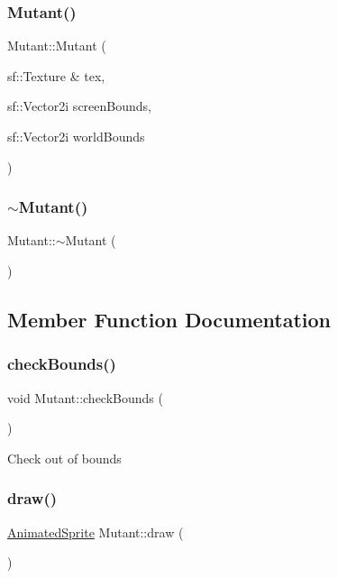 \subsubsection{\texorpdfstring{Mutant()}{Mutant()}}
{\footnotesize\ttfamily Mutant\+::\+Mutant (\begin{DoxyParamCaption}\item[{sf\+::\+Texture \&}]{tex,  }\item[{sf\+::\+Vector2i}]{screen\+Bounds,  }\item[{sf\+::\+Vector2i}]{world\+Bounds }\end{DoxyParamCaption})}

\mbox{\label{class_mutant_a03dc2cf4d08ea08bea6cd4ded784dfc1}} 
\subsubsection{\texorpdfstring{$\sim$\+Mutant()}{~Mutant()}}
{\footnotesize\ttfamily Mutant\+::$\sim$\+Mutant (\begin{DoxyParamCaption}{ }\end{DoxyParamCaption})}



\subsection{Member Function Documentation}
\mbox{\label{class_mutant_a46424e3134923fed261aec4cfeee43d5}} 
\subsubsection{\texorpdfstring{check\+Bounds()}{checkBounds()}}
{\footnotesize\ttfamily void Mutant\+::check\+Bounds (\begin{DoxyParamCaption}{ }\end{DoxyParamCaption})}

Check out of bounds \mbox{\label{class_mutant_ad085db34f2e45e82b6b7bb6bfc4be1c7}} 
\subsubsection{\texorpdfstring{draw()}{draw()}}
{\footnotesize\ttfamily \hyperlink{class_animated_sprite}{Animated\+Sprite} Mutant\+::draw (\begin{DoxyParamCaption}{ }\end{DoxyParamCaption})}

